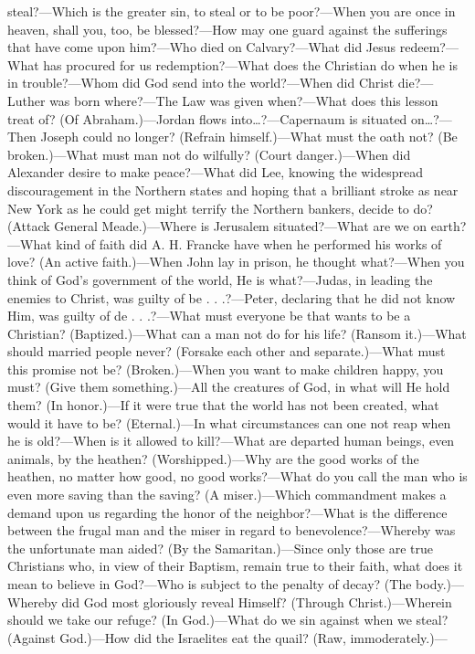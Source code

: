 steal?—Which is the greater sin, to steal or to be poor?—When you are once in heaven, shall you, too, be blessed?—How may one guard against the sufferings that have come upon him?—Who died on Calvary?—What did Jesus redeem?—What has procured for us redemption?—What does the Christian do when he is in trouble?—Whom did God send into the world?—When did Christ die?—Luther was born where?—The Law was given when?—What does this lesson treat of? (Of Abraham.)—Jordan flows into…?—Capernaum is situated on…?—Then Joseph could no longer? (Refrain himself.)—What must the oath not? (Be broken.)—What must man not do wilfully? (Court danger.)—When did Alexander desire to make peace?—What did Lee, knowing the widespread discouragement in the Northern states and hoping that a brilliant stroke as near New York as he could get might terrify the Northern bankers, decide to do? (Attack General Meade.)—Where is Jerusalem situated?—What are we on earth?—What kind of faith did A. H. Francke have when he performed his works of love? (An active faith.)—When John lay in prison, he thought what?—When you think of God’s government of the world, He is what?—Judas, in leading the enemies to Christ, was guilty of be . . .?—Peter, declaring that he did not know Him, was guilty of de . . .?—What must everyone be that wants to be a Christian? (Baptized.)—What can a man not do for his life? (Ransom it.)—What should married people never? (Forsake each other and separate.)—What must this promise not be? (Broken.)—When you want to make children happy, you must? (Give them something.)—All the creatures of God, in what will He hold them? (In honor.)—If it were true that the world has not been created, what would it have to be? (Eternal.)—In what circumstances can one not reap when he is old?—When is it allowed to kill?—What are departed human beings, even animals, by the heathen? (Worshipped.)—Why are the good works of the heathen, no matter how good, no good works?—What do you call the man who is even more saving than the saving? (A miser.)—Which commandment makes a demand upon us regarding the honor of the neighbor?—What is the difference between the frugal man and the miser in regard to benevolence?—Whereby was the unfortunate man aided? (By the Samaritan.)—Since only those are true Christians who, in view of their Baptism, remain true to their faith, what does it mean to believe in God?—Who is subject to the penalty of decay? (The body.)—Whereby did God most gloriously reveal Himself? (Through Christ.)—Wherein should we take our refuge? (In God.)—What do we sin against when we steal? (Against God.)—How did the Israelites eat the quail? (Raw, immoderately.)—
